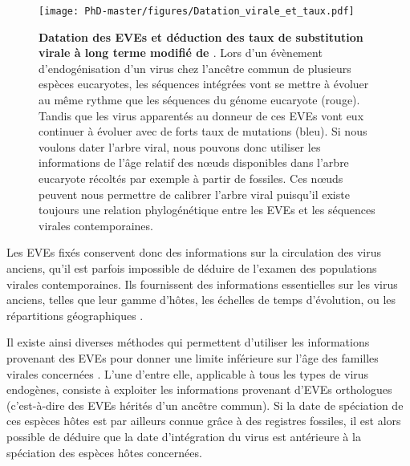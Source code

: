 \begin{figure}[!htpb]
\captionsetup{font=footnotesize}
 \centering
  \texttt{[image: PhD-master/figures/Datation\_virale\_et\_taux.pdf]}
\caption[Intro:Schéma du principe de datation des EVEs ]{\textbf{Datation des EVEs et déduction des taux de substitution virale à long terme modifié de \cite{feschotte_endogenous_2012}}. Lors d'un évènement d'endogénisation d'un virus chez l'ancêtre commun de plusieurs espèces eucaryotes, les séquences intégrées vont se mettre à évoluer au même rythme que les séquences du génome eucaryote (rouge). Tandis que les virus apparentés au donneur de ces EVEs vont eux continuer à évoluer avec de forts taux de mutations (bleu). Si nous voulons dater l'arbre viral, nous pouvons donc utiliser les informations de l'âge relatif des nœuds disponibles dans l'arbre eucaryote récoltés par exemple à partir de fossiles. Ces nœuds peuvent nous permettre de calibrer l'arbre viral puisqu'il existe toujours une relation phylogénétique entre les EVEs et les séquences virales contemporaines.}
\label{figure:Datation_virale_et_taux}
\end{figure}

Les EVEs fixés conservent donc des informations sur la circulation des virus anciens, qu'il est parfois impossible de déduire de l'examen des populations virales contemporaines. Ils fournissent des informations essentielles sur les virus anciens, telles que leur gamme d'hôtes, les échelles de temps d'évolution, ou les répartitions géographiques \citep{gifford_transitional_2008,katzourakis_endogenous_2010}.

Il existe ainsi diverses méthodes qui permettent d'utiliser les informations provenant des EVEs pour donner une limite inférieure sur l'âge des familles virales concernées \citep{aiewsakun_endogenous_2015}. L'une d'entre elle, applicable à tous les types de virus endogènes, consiste à exploiter les informations provenant d'EVEs orthologues (c'est-à-dire des EVEs hérités d'un ancêtre commun). Si la date de spéciation de ces espèces hôtes est par ailleurs connue grâce à des registres fossiles, il est alors possible de déduire que la date d'intégration du virus est antérieure à la spéciation des espèces hôtes concernées. 

